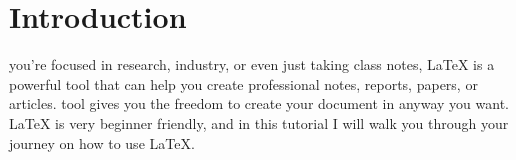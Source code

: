 \documentclass[12pt,journal,compsoc]{IEEEtran}
\begin{document}
\section{Introduction}
%
%



% 
% 
% 
% 

 you're focused in research, industry, or even just taking class notes, \LaTeX{} is a powerful tool that can help you create professional notes, reports, papers, or articles. 
 tool gives you the freedom to create your document in anyway you want. \LaTeX{} is very beginner friendly, and in this tutorial I will walk you through your journey on how to use \LaTeX{}.
\end{document}
